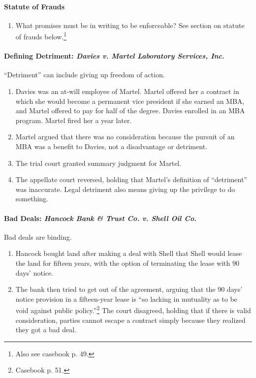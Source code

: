 \paragraph{Statute of Frauds}

\begin{enumerate}
    \item What promises must be in writing to be enforceable? See section on 
    statute of frauds below.\footnote{Also see casebook p. 49.}
\end{enumerate}

\paragraph{Defining Detriment: \emph{Davies v. Martel Laboratory Services, 
Inc.}}

``Detriment'' can include giving up freedom of action.

\begin{enumerate}
    \item Davies was an at-will employee of Martel. Martel offered her a 
    contract in which she would become a permanent vice president if she 
    earned an MBA, and Martel offered to pay for half of the degree. Davies 
    enrolled in an MBA program. Martel fired her a year later.
    \item Martel argued that there was no consideration because the pursuit of 
    an MBA was a benefit to Davies, not a disadvantage or detriment.
    \item The trial court granted summary judgment for Martel.
    \item The appellate court reversed, holding that Martel's definition of 
    ``detriment'' was inaccurate. Legal detriment also means giving up the 
    privilege to do something.
\end{enumerate}

\paragraph{Bad Deals: \emph{Hancock Bank \& Trust Co. v. Shell Oil Co.}}

Bad deals are binding.

\begin{enumerate}
    \item Hancock bought land after making a deal with Shell that Shell would 
    lease the land for fifteen years, with the option of terminating the lease 
    with 90 days' notice.
    \item The bank then tried to get out of the agreement, arguing that the 90 
    days' notice provision in a fifteen-year lease is ``so lacking in 
    mutuality as to be void against public policy.''\footnote{Casebook p. 51.} 
    The court disagreed, holding that if there is valid consideration, parties 
    cannot escape a contract simply because they realized they got a bad deal.
\end{enumerate}

